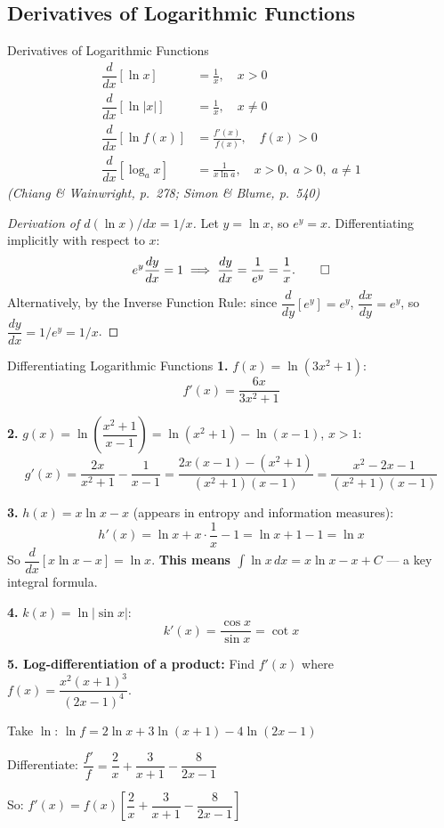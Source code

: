 \documentclass[12pt, a4paper]{article}
\theoremstyle{definition}
\newcommand{\ddd}[2]{\dfrac{d#1}{d#2}}
\begin{document}
\subsection{Derivatives of Logarithmic Functions}

\begin{thmbox}{Derivatives of Logarithmic Functions}
\begin{align}
  \ddd{}{x}[\ln x] &= \frac{1}{x}, \quad x > 0 \label{eq:dlnx}\\[4pt]
  \ddd{}{x}[\ln|x|] &= \frac{1}{x}, \quad x \neq 0 \label{eq:dlnabsx}\\[4pt]
  \ddd{}{x}[\ln f(x)] &= \frac{f'(x)}{f(x)}, \quad f(x) > 0 \label{eq:dlnfx}\\[4pt]
  \ddd{}{x}[\log_a x] &= \frac{1}{x \ln a}, \quad x > 0,\; a>0,\;a\neq 1 \label{eq:dlogax}
\end{align}
\emph{(Chiang \& Wainwright, p.\ 278; Simon \& Blume, p.\ 540)}
\end{thmbox}

\begin{proof}[Derivation of $d(\ln x)/dx = 1/x$]
Let $y = \ln x$, so $e^y = x$. Differentiating implicitly with respect to $x$:
\[
  e^y \ddd{y}{x} = 1
  \implies \ddd{y}{x} = \frac{1}{e^y} = \frac{1}{x}. \qed
\]
Alternatively, by the Inverse Function Rule: since $\ddd{}{y}[e^y]=e^y$,
$\ddd{x}{y}=e^y$, so $\ddd{y}{x}=1/e^y=1/x$.
\end{proof}

\begin{exbox}{Differentiating Logarithmic Functions}
\textbf{1.} $f(x) = \ln(3x^2+1)$:
\[
  f'(x) = \frac{6x}{3x^2+1}
\]

\textbf{2.} $g(x) = \ln\!\left(\dfrac{x^2+1}{x-1}\right) = \ln(x^2+1) - \ln(x-1)$, $x>1$:
\[
  g'(x) = \frac{2x}{x^2+1} - \frac{1}{x-1}
         = \frac{2x(x-1) - (x^2+1)}{(x^2+1)(x-1)}
         = \frac{x^2-2x-1}{(x^2+1)(x-1)}
\]

\textbf{3.} $h(x) = x\ln x - x$ (appears in entropy and information measures):
\[
  h'(x) = \ln x + x\cdot\frac{1}{x} - 1 = \ln x + 1 - 1 = \ln x
\]
So $\ddd{}{x}[x\ln x - x] = \ln x$. \textbf{This means $\int \ln x\,dx = x\ln x - x + C$} --- a key integral formula.

\textbf{4.} $k(x) = \ln|\sin x|$:
\[
  k'(x) = \frac{\cos x}{\sin x} = \cot x
\]

\textbf{5. Log-differentiation of a product:}
Find $f'(x)$ where $f(x) = \dfrac{x^2(x+1)^3}{(2x-1)^4}$.

Take $\ln$:
$\ln f = 2\ln x + 3\ln(x+1) - 4\ln(2x-1)$

Differentiate:
$\dfrac{f'}{f} = \dfrac{2}{x} + \dfrac{3}{x+1} - \dfrac{8}{2x-1}$

So: $f'(x) = f(x)\left[\dfrac{2}{x}+\dfrac{3}{x+1}-\dfrac{8}{2x-1}\right]$
\end{exbox}
\end{document}
